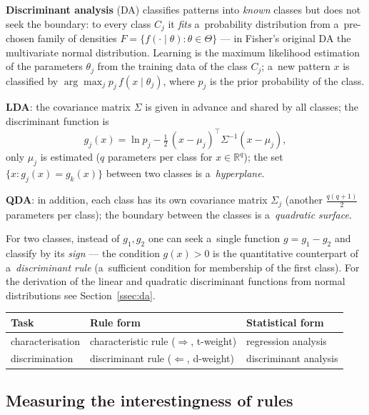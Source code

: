 \documentclass[11pt,a4paper]{article}
\theoremstyle{definition}
\begin{document}
\textbf{Discriminant analysis} (DA) classifies patterns into \emph{known} classes but
does not seek the boundary: to every class $C_j$ it \emph{fits} a~probability
distribution from a~pre-chosen family of densities
$F=\{f(\cdot\mid\theta):\theta\in\Theta\}$ --- in Fisher's original DA the multivariate
normal distribution. Learning is the maximum likelihood estimation of the parameters
$\theta_j$ from the training data of the class $C_j$; a~new pattern $x$ is classified
by $\arg\max_j p_j\,f(x\mid\theta_j)$, where $p_j$ is the prior probability of the
class.

\begin{defbox}
\textbf{LDA}: the covariance matrix $\Sigma$ is given in advance and shared by all
classes; the discriminant function is
\[ g_j(x)=\ln p_j-\tfrac12\,(x-\mu_j)^{\!\top}\Sigma^{-1}(x-\mu_j), \]
only $\mu_j$ is estimated ($q$ parameters per class for $x\in\mathbb{R}^q$); the set
$\{x: g_j(x)=g_k(x)\}$ between two classes is a~\emph{hyperplane}.

\textbf{QDA}: in addition, each class has its own covariance matrix $\Sigma_j$ (another
$\tfrac{q(q+1)}{2}$ parameters per class); the boundary between the classes is
a~\emph{quadratic surface}.
\end{defbox}

For two classes, instead of $g_1,g_2$ one can seek a~single function $g=g_1-g_2$ and
classify by its \emph{sign} --- the condition $g(x)>0$ is the quantitative counterpart
of a~\emph{discriminant rule} (a~sufficient condition for membership of the first
class). For the derivation of the linear and quadratic discriminant functions from
normal distributions see Section~\ref{ssec:da}.

\begin{center}
\small
\begin{tabular}{@{}lll@{}}
\toprule
\textbf{Task} & \textbf{Rule form} & \textbf{Statistical form} \\
\midrule
characterisation & characteristic rule ($\Rightarrow$, t-weight) & regression analysis \\
discrimination & discriminant rule ($\Leftarrow$, d-weight) & discriminant analysis \\
\bottomrule
\end{tabular}
\end{center}

\subsection{Measuring the interestingness of rules}
\label{ssec:zajimavost}
\end{document}
